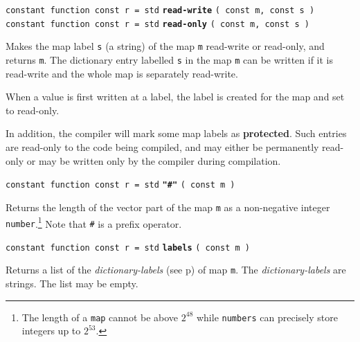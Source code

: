 \documentclass[12pt]{article}
\newcommand{\key}[1]{{\rm \bfseries #1}}
\newcommand{\ttkey}[1]{{\tt \bfseries #1}}
\newcommand{\pagref}[1]{p\pageref{#1}}
\newenvironment{indpar}[1][0.3in]%
	{\begin{list}{}%
		     {\setlength{\itemsep}{0in}%
		      \setlength{\topsep}{0in}%
		      \setlength{\parsep}{1ex}%
		      \setlength{\labelwidth}{#1}%
		      \setlength{\leftmargin}{#1}%
		      \addtolength{\leftmargin}{\labelsep}}%
	 \item}%
	{\end{list}}
\begin{document}
{\tt constant function const r = std} \ttkey{read-write}
                                      {\tt ( const m, const s )} \\
{\tt constant function const r = std} \ttkey{read-only}
                                      {\tt ( const m, const s )} %
\label{READ-ONLY-DICTIONARY-FUNCTION}
\begin{indpar}
Makes the map label {\tt s} (a string) of the map {\tt m}
read-write or read-only, and returns {\tt m}.  The dictionary entry
labelled {\tt s} in the map {\tt m} can be written if it is
read-write and the whole map is separately read-write.

When a value is first written at a label, the label is created
for the map and set to read-only.

In addition, the compiler will mark some map labels as \key{protected}.
Such entries are read-only to the code being compiled, and may either be
permanently read-only or may be written only by the compiler
during compilation.
\end{indpar}

{\tt constant function const r = std} \ttkey{"\#"} {\tt ( const m )}
\begin{indpar}
Returns the length of the vector part of the map {\tt m}
as a non-negative integer
{\tt number}.\footnote{The length of a {\tt map} cannot
be above $2^{48}$ while
{\tt numbers} can precisely store integers up to $2^{53}$.}
Note that {\tt \#} is a prefix operator.
\end{indpar}

{\tt constant function const r = std} \ttkey{labels} {\tt ( const m )}
\begin{indpar}
Returns a list of the {\em dictionary-labels}
(see \pagref{DICTIONARY-LABEL}) of map {\tt m}.
The {\em dictionary-labels} are strings.  The list may be empty.
\end{indpar}
\end{document}
